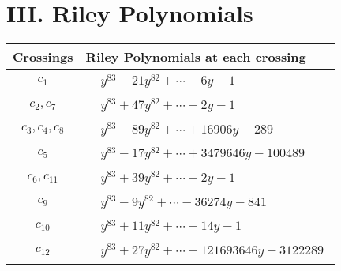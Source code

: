\documentclass[1p]{elsarticle_modified}
\theoremstyle{definition}
\begin{document}
\centering \section*{ III. Riley Polynomials}
\begin{tabular}{m{50pt}|m{274pt}}
Crossings & \hspace{64pt}Riley Polynomials at each crossing \\
\hline $$\begin{aligned}c_{1}\end{aligned}$$&$\begin{aligned}
&y^{83}-21 y^{82}+\cdots-6 y-1
\end{aligned}$\\
\hline $$\begin{aligned}c_{2},c_{7}\end{aligned}$$&$\begin{aligned}
&y^{83}+47 y^{82}+\cdots-2 y-1
\end{aligned}$\\
\hline $$\begin{aligned}c_{3},c_{4},c_{8}\end{aligned}$$&$\begin{aligned}
&y^{83}-89 y^{82}+\cdots+16906 y-289
\end{aligned}$\\
\hline $$\begin{aligned}c_{5}\end{aligned}$$&$\begin{aligned}
&y^{83}-17 y^{82}+\cdots+3479646 y-100489
\end{aligned}$\\
\hline $$\begin{aligned}c_{6},c_{11}\end{aligned}$$&$\begin{aligned}
&y^{83}+39 y^{82}+\cdots-2 y-1
\end{aligned}$\\
\hline $$\begin{aligned}c_{9}\end{aligned}$$&$\begin{aligned}
&y^{83}-9 y^{82}+\cdots-36274 y-841
\end{aligned}$\\
\hline $$\begin{aligned}c_{10}\end{aligned}$$&$\begin{aligned}
&y^{83}+11 y^{82}+\cdots-14 y-1
\end{aligned}$\\
\hline $$\begin{aligned}c_{12}\end{aligned}$$&$\begin{aligned}
&y^{83}+27 y^{82}+\cdots-121693646 y-3122289
\end{aligned}$\\
\hline
\end{tabular}
\vskip 2pc
\end{document}
